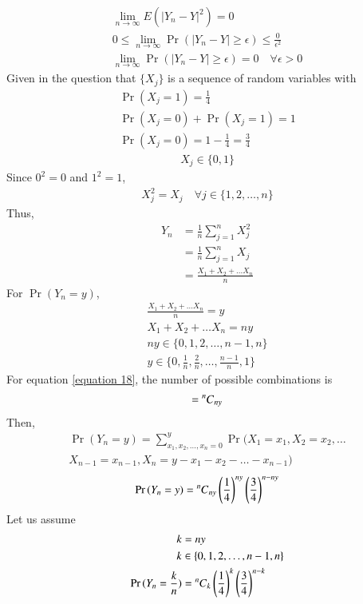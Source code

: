 \documentclass[journal,12pt,twocolumn]{IEEEtran}
\begin{document}
\begin{align}
    \lim_{n\rightarrow \infty} E(|Y_n-Y|^2) = 0 
    \\0 \leq  \lim_{n\rightarrow \infty}\Pr{(|Y_n-Y|\geq \epsilon)}  \leq \frac{0}{\epsilon^2}
    \\   \lim_{n\rightarrow \infty}\Pr{(|Y_n-Y|\geq \epsilon)} = 0 \quad \forall \epsilon >0
\end{align}
Given in the question that $\{X_j\}$ is a sequence of random variables with
\begin{align}
    \Pr{(X_j=1)} = \frac{1}{4}
    \\\Pr{(X_j=0)} + \Pr{(X_j=1)} = 1
    \\\Pr{(X_j=0)} = 1 - \frac{1}{4} = \frac{3}{4}
\end{align}
\begin{align}
    X_j \in \{0,1\} 
\end{align}
Since $0^2 = 0$ and $1^2 = 1$, 
\begin{align}
    X_j^2 = X_j \quad \forall j \in \{1, 2,\hdots, n\}
\end{align}
Thus, 
\begin{align}
    Y_n &= \frac{1}{n} \sum_{j=1}^{n}X_j^2 
    \\&= \frac{1}{n} \sum_{j=1}^{n}X_j
    \\&= \frac{X_1 + X_2 + \hdots X_n}{n}
\end{align}
For $\Pr{(Y_n = y)}$,
\begin{align}
    \frac{X_1 + X_2 + \hdots X_n}{n} = y
    \\X_1 + X_2 + \hdots X_n = ny \label{equation 18}
    \\ny \in \{0,1,2,\hdots,n-1,n\}
    \\y \in \{0, \frac{1}{n}, \frac{2}{n},\hdots,\frac{n-1}{n}, 1\}
\end{align}
For equation \eqref{equation 18}, the number of possible combinations is
\begin{align}
    = \comb[n]{ny}
\end{align}
Then,
\begin{multline}
    \Pr{(Y_n = y)} = \sum_{x_1,x_2,\hdots,x_n=0}^{y} \Pr(X_1=x_1, X_2=x_2,\hdots \\ X_{n-1}=x_{n-1},X_n=y-x_1-x_2-\hdots-x_{n-1})
\end{multline}
\begin{align}
    \Pr{(Y_n = y)} = \comb[n]{ny} \brak{\frac{1}{4}}^{ny} \brak{\frac{3}{4}}^{n-ny}
\end{align}
Let us assume
\begin{align}
    k &= ny
    \\k &\in \{0,1,2,\hdots,n-1,n\}
    \\ \Pr{(Y_n = \frac{k}{n})} &= \comb[n]{k} \brak{\frac{1}{4}}^{k} \brak{\frac{3}{4}}^{n-k}
\end{align}
\end{document}
